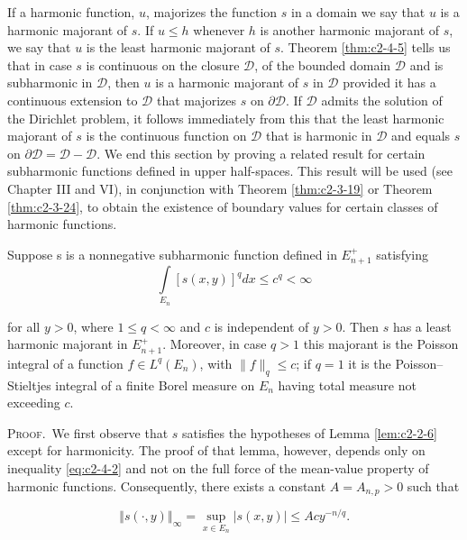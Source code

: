 If a harmonic function, $u$, majorizes the function $s$ in a domain we say that $u$ is a harmonic majorant of $s$. If $u \leq h$ whenever $h$ is another harmonic majorant of $s$, we say that $u$ is the least harmonic majorant of $s$. Theorem \ref{thm:c2-4-5} tells us that in case $s$ is continuous on the closure $\mathcal{D}$, of the bounded domain $\mathcal{D}$ and is subharmonic in $\mathcal{D}$, then $u$ is a harmonic majorant of $s$ in $\mathcal{D}$ provided it has a continuous extension to $\mathcal{D}$ that majorizes $s$ on $\partial\mathcal{D}$. If $\mathcal{D}$ admits the solution of the Dirichlet problem, it follows immediately from this that the least harmonic majorant of $s$ is the continuous function on $\mathcal{D}$ that is harmonic in $\mathcal{D}$ and equals $s$ on $\partial\mathcal{D} = \mathcal{D} - \mathcal{D}$. We end this section by proving a related result for certain subharmonic functions defined in upper half-spaces. This result will be used (see Chapter III and VI), in conjunction with Theorem \ref{thm:c2-3-19} or Theorem \ref{thm:c2-3-24}, to obtain the existence of boundary values for certain classes of harmonic functions.

\begin{theorem}
\label{thm:c2-4-6}
Suppose s is a nonnegative subharmonic function defined in $E_{n+1}^{+}$ satisfying
\begin{equation}\label{eq:c2-4-7}
\int\limits_{E_{n}}[s(x,y)]^{q} dx\leq c^{q}<\infty
\end{equation}

for all $y > 0$, where $1 \leq q < \infty$ and $c$ is independent of $y > 0$. Then $s$ has a least harmonic majorant in $E_{n+1}^{+}$. Moreover, in case $q > 1$ this majorant is the Poisson integral of a function $f \in L^{q}(E_{n})$, with $\|f\|_{q} \leq c$; if $q = 1$ it is the Poisson--Stieltjes integral of a finite Borel measure on $E_{n}$ having total measure not exceeding $c$.
\end{theorem}

\textsc{Proof.}\ We first observe that $s$ satisfies the hypotheses of Lemma \ref{lem:c2-2-6} except for harmonicity. The proof of that lemma, however, depends only on inequality \eqref{eq:c2-4-2} and not on the full force of the mean-value property of harmonic functions. Consequently, there exists a constant $A = A_{n,p} > 0$ such that

\begin{equation}\label{eq:c2-4-8}
\left\Vert s(\cdot,y)\right\Vert_{\infty}=\sup_{x\in E_{n}}\left\vert s(x,y)\right\vert\leq Acy^{-n/q}.
\end{equation}

